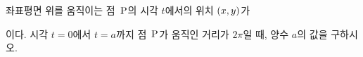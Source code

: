 \hspace*{2mm}\begin{minipage}[t]{\dimexpr\linewidth-2mm\relax}\vspace{0pt}
좌표평면 위를 움직이는 점~$\mathrm{P}$의 시각 $t$에서의 위치 $(x{,}\mkern3mu\mathopen{}y)$가 \par\smallskip{}\par\smallskip\noindent 이다. 시각 $t=0$에서 $t=a$까지 점~$\mathrm{P}$가 움직인 거리가 $2\pi$일 때, 양수 $a$의 값을 구하시오.\end{minipage}
